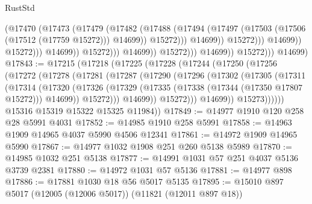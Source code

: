 \begin{lexlean}{RustStd}
\begin{coremodule}
                                                  (@17470
                                                    (@17473
                                                      (@17479
                                                        (@17482
                                                          (@17488
                                                            (@17494
                                                              (@17497
                                                                (@17503
                                                                  (@17506 (@17512 (@17759 @15272)))
                                                                  @14699))
                                                              @15272)))
                                                        @14699))
                                                    @15272)))
                                              @14699))
                                          @15272)))
                                    @14699))
                                @15272)))
                          @14699))
                      @15272)))
                @14699))
            @15272)))
      @14699)
@17843 := @17215
    (@17218
      (@17225
        (@17228
          (@17244
            (@17250
              (@17256
                (@17272
                  (@17278
                    (@17281
                      (@17287
                        (@17290
                          (@17296
                            (@17302
                              (@17305
                                (@17311
                                  (@17314
                                    (@17320
                                      (@17326
                                        (@17329
                                          (@17335 (@17338 (@17344 (@17350 @17807 @15272))) @14699))
                                        @15272)))
                                  @14699))
                              @15272)))
                        @14699))
                    @15273))))))
        @15316
        @15319
        @15322
        @15325
        @11984))
@17849 := @14977 @1910 @120 @258 @28 @5991 @4031
@17852 := @14985 @1910 @258 @5991
@17858 := @14963 @1909 @14965 @4037 @5990 @4506 @12341
@17861 := @14972 @1909 @14965 @5990
@17867 := @14977 @1032 @1908 @251 @260 @5138 @5989
@17870 := @14985 @1032 @251 @5138
@17877 := @14991 @1031 @57 @251 @4037 @5136 @3739 @2381
@17880 := @14972 @1031 @57 @5136
@17881 := @14977 @898
@17886 := @17881 @1030 @18 @56 @5017 @5135
@17895 := @15010 @897 @5017 (@12005 (@12006 @5017)) (@11821 (@12011 @897 @18))

\end{coremodule}
\end{lexlean}
